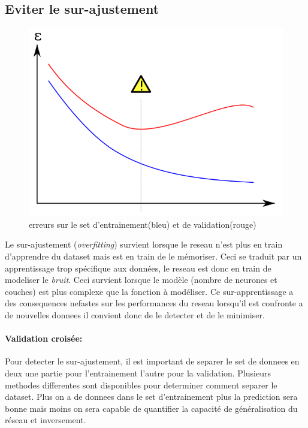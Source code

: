 \documentclass[11pt]{article}
\begin{document}
\subsection{Eviter le sur-ajustement}\label{overfitting}
\begin{figure}[htp]
	\centering
	\includegraphics[scale=.4]{img/overfitting.png}
	\caption{erreurs sur le set d'entrainement(bleu) et de validation(rouge)}
\end{figure}
Le sur-ajustement (\emph{overfitting}) survient lorsque le reseau n'est plus
en train d'apprendre du dataset mais est en train de le m\'emoriser. Ceci se
traduit par un apprentissage trop sp\'ecifique aux donn\'ees, le reseau est
donc en train de modeliser le \emph{bruit}. Ceci survient lorsque le mod\`ele
(nombre de neurones et couches) est plus complexe que la fonction \`a
mod\'eliser. Ce sur-apprentissage a des consequences nefastes sur les
performances du reseau lorsqu'il est confronte a de nouvelles donnees il convient
donc de le detecter et de le minimiser.
\paragraph{Validation crois\'ee:} Pour detecter le sur-ajustement, il est
important de separer le set de donnees en deux une partie pour l'entrainement
l'autre pour la validation. Plusieurs methodes differentes sont disponibles
pour determiner comment separer le dataset. Plus on a de donnees dans le set
d'entrainement plus la prediction sera bonne mais moins on sera capable de
quantifier la capacit\'e de g\'en\'eralisation du r\'eseau et inversement.
\end{document}
